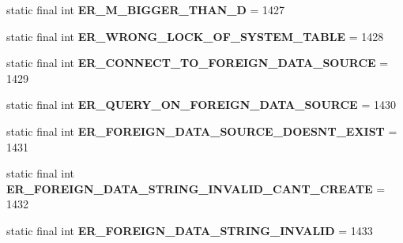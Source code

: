 \begin{DoxyCompactItemize}
\item 
\mbox{\label{classcom_1_1mysql_1_1jdbc_1_1_mysql_error_numbers_ad44e2cf64e83f7265a2dc77393ec6cc7}} 
static final int {\bfseries E\+R\+\_\+\+M\+\_\+\+B\+I\+G\+G\+E\+R\+\_\+\+T\+H\+A\+N\+\_\+D} = 1427
\item 
\mbox{\label{classcom_1_1mysql_1_1jdbc_1_1_mysql_error_numbers_a21e2daaaf03a76fb36ba7bd83513ed19}} 
static final int {\bfseries E\+R\+\_\+\+W\+R\+O\+N\+G\+\_\+\+L\+O\+C\+K\+\_\+\+O\+F\+\_\+\+S\+Y\+S\+T\+E\+M\+\_\+\+T\+A\+B\+LE} = 1428
\item 
\mbox{\label{classcom_1_1mysql_1_1jdbc_1_1_mysql_error_numbers_a832d5575d22528d8dd31e594e72101fe}} 
static final int {\bfseries E\+R\+\_\+\+C\+O\+N\+N\+E\+C\+T\+\_\+\+T\+O\+\_\+\+F\+O\+R\+E\+I\+G\+N\+\_\+\+D\+A\+T\+A\+\_\+\+S\+O\+U\+R\+CE} = 1429
\item 
\mbox{\label{classcom_1_1mysql_1_1jdbc_1_1_mysql_error_numbers_a039283b82055e415d7277e1615f6cf28}} 
static final int {\bfseries E\+R\+\_\+\+Q\+U\+E\+R\+Y\+\_\+\+O\+N\+\_\+\+F\+O\+R\+E\+I\+G\+N\+\_\+\+D\+A\+T\+A\+\_\+\+S\+O\+U\+R\+CE} = 1430
\item 
\mbox{\label{classcom_1_1mysql_1_1jdbc_1_1_mysql_error_numbers_a763ca3edf31b130c6a6895e33c840f09}} 
static final int {\bfseries E\+R\+\_\+\+F\+O\+R\+E\+I\+G\+N\+\_\+\+D\+A\+T\+A\+\_\+\+S\+O\+U\+R\+C\+E\+\_\+\+D\+O\+E\+S\+N\+T\+\_\+\+E\+X\+I\+ST} = 1431
\item 
\mbox{\label{classcom_1_1mysql_1_1jdbc_1_1_mysql_error_numbers_a4b21678c0c9ae001faacc92ab4cc2170}} 
static final int {\bfseries E\+R\+\_\+\+F\+O\+R\+E\+I\+G\+N\+\_\+\+D\+A\+T\+A\+\_\+\+S\+T\+R\+I\+N\+G\+\_\+\+I\+N\+V\+A\+L\+I\+D\+\_\+\+C\+A\+N\+T\+\_\+\+C\+R\+E\+A\+TE} = 1432
\item 
\mbox{\label{classcom_1_1mysql_1_1jdbc_1_1_mysql_error_numbers_a63e8071c78daca349a80382bba3c6f8f}} 
static final int {\bfseries E\+R\+\_\+\+F\+O\+R\+E\+I\+G\+N\+\_\+\+D\+A\+T\+A\+\_\+\+S\+T\+R\+I\+N\+G\+\_\+\+I\+N\+V\+A\+L\+ID} = 1433

\end{DoxyCompactItemize}
